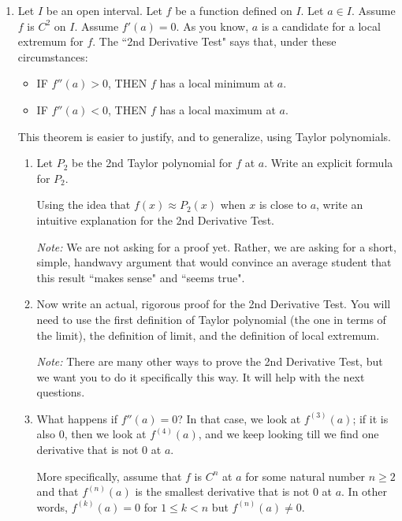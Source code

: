 \documentclass[12pt]{exam}
\begin{document}
\begin{enumerate}
\item  Let $I$ be an open interval.    Let $f$ be a function defined on $I$.  Let $a \in I$.  Assume $f$ is $C^2$ on $I$.   Assume $f'(a) = 0$.   As you know, $a$ is a candidate for a local extremum for $f$.  The ``2nd Derivative Test" says that, under these circumstances:
	\begin{itemize}
		\item  IF $f''(a)>0$, THEN $f$ has a local minimum at $a$.
		\item  IF $f''(a)<0$, THEN $f$ has a local maximum at $a$.
	\end{itemize}
	 This theorem is easier to justify, and to generalize, using Taylor polynomials.
	\begin{enumerate}
		\item  \label{qu:int} Let $P_2$ be the 2nd Taylor polynomial for $f$ at $a$.  Write an explicit formula for $P_2$.
		
			Using the idea that $f(x) \approx P_2(x)$ when $x$ is close to $a$, write an intuitive explanation for the 2nd Derivative Test.  
			
			\emph{Note:}  We are not asking for a proof yet.  Rather, we are asking for a short, simple, handwavy argument that would convince an average student that this result ``makes sense" and ``seems true".
			
		\item  \label{qu:pf} Now write an actual, rigorous proof for the 2nd Derivative Test.  You will need to use the first definition of Taylor polynomial (the one in terms of the limit), the definition of limit, and the definition of local extremum.
				
			\emph{Note:}  There are many other ways to prove the 2nd Derivative Test, but we want you to do it specifically this way. It will help with the next questions.
	
		\item \label{qu:conj} What happens if $f''(a)=0$?     In that case, we look at $f^{(3)}(a)$;  if it is also $0$, then we look at $f^{(4)}(a)$, and we keep looking till we find one derivative that is not $0$ at $a$.   
		
		More specifically, assume that $f$ is $C^n$ at $a$ for some natural number $n \geq 2$ and that $f^{(n)}(a)$ is the smallest derivative  that is not $0$ at $a$.   In other words, $f^{(k)}(a) =0$ for $ 1 \leq k < n$ but $f^{(n)}(a) \neq 0$.
		

\end{enumerate}
\end{enumerate}
\end{document}
